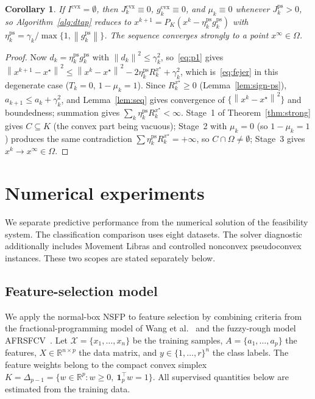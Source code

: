 \documentclass[]{interact}
\theoremstyle{plain}
\newtheorem{corollary}[theorem]{Corollary}
\theoremstyle{definition}
\theoremstyle{remark}
\newcommand{\R}{\mathbb{R}}
\newcommand{\norm}[1]{\left\lVert #1 \right\rVert}
\newcommand{\cvx}{\mathrm{cvx}}
\newcommand{\ps}{\mathrm{ps}}
\begin{document}
\begin{corollary}\label{cor:ps}
If $I^{\cvx}=\emptyset$, then $J^{\cvx}_k\equiv0$, $g^{\cvx}_k\equiv0$, and $\mu_k\equiv0$
whenever $J^{\ps}_k>0$, so Algorithm~\ref{alg:dtap} reduces to
$x^{k+1}=P_K(x^k-\eta^{\ps}_k g^{\ps}_k)$ with $\eta^{\ps}_k=\gamma_k/\max\{1,\norm{g^{\ps}_k}\}$.
The sequence converges strongly to a point $x^\infty\in\Omega$.
\end{corollary}
\begin{proof}
Now $d_k=\eta^{\ps}_k g^{\ps}_k$ with $\norm{d_k}^2\le\gamma_k^2$, so~\eqref{eq:p1} gives
$\norm{x^{k+1}-x^\star}^2\le\norm{x^k-x^\star}^2-2\eta^{\ps}_k R^{x^\star}_k+\gamma_k^2$,
which is~\eqref{eq:fejer} in this degenerate case ($T_k=0$, $1-\mu_k=1$). Since
$R^{x^\star}_k\ge0$ (Lemma~\ref{lem:sign-ps}), $a_{k+1}\le a_k+\gamma_k^2$, and
Lemma~\ref{lem:seq} gives convergence of $\{\norm{x^k-x^\star}^2\}$ and boundedness;
summation gives $\sum_k\eta^{\ps}_k R^{x^\star}_k<\infty$. Stage~1 of
Theorem~\ref{thm:strong} gives $C\subseteq K$ (the convex part being vacuous); Stage~2 with
$\mu_k=0$ (so $1-\mu_k=1$) produces the same contradiction $\sum\eta^{\ps}_k R^{x^\star}_k=+\infty$,
so $C\cap\Omega\ne\emptyset$; Stage~3 gives $x^k\to x^\infty\in\Omega$.
\end{proof}


\section{Numerical experiments}\label{sec:experiments}
We separate predictive performance from the numerical solution of the feasibility system. The classification comparison uses eight datasets. The solver diagnostic additionally includes Movement Libras and controlled nonconvex pseudoconvex instances. These two scopes are stated separately below.

\subsection{Feature-selection model}\label{sec:fs}
We apply the normal-box NSFP to feature selection by combining criteria from the fractional-programming model of Wang et al.~\citep{wang2021fractional} and the fuzzy-rough model AFRSFCV~\citep{wang2026afrsfcv}. Let $\mathcal{X}=\{x_1,\ldots,x_n\}$ be the training samples, $A=\{a_1,\ldots,a_p\}$ the features, $X\in\R^{n\times p}$ the data matrix, and $y\in\{1,\ldots,r\}^n$ the class labels. The feature weights belong to the compact convex simplex $K=\Delta_{p-1}=\{w\in\R^p:w\ge0,\ \mathbf1_p^{\top}w=1\}$. All supervised quantities below are estimated from the training data.
\end{document}
